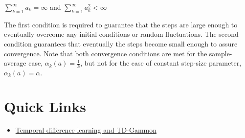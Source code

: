 \documentclass[a4paper]{article}
\begin{document}
$\sum_{k=1}^\infty a_k = \infty$	and	$\sum_{k=1}^\infty a_k^2 < \infty$

The first condition is required to guarantee that the steps are large enough to eventually overcome any initial conditions or random fluctuations. The second condition guarantees that eventually the steps become small enough to assure convergence. Note that both convergence conditions are met for the sample-average case, $\alpha_k(a) = \frac{1}{k}$, but not for the case of constant step-size parameter, $\alpha_k(a) = \alpha$.

\section{Quick Links}
\begin{itemize}
\item \href{https://courses.cs.washington.edu/courses/cse590hk/01sp/Readings/tesauro95cacm.pdf}{Temporal difference learning and TD-Gammon}
\end{itemize}
\end{document}

